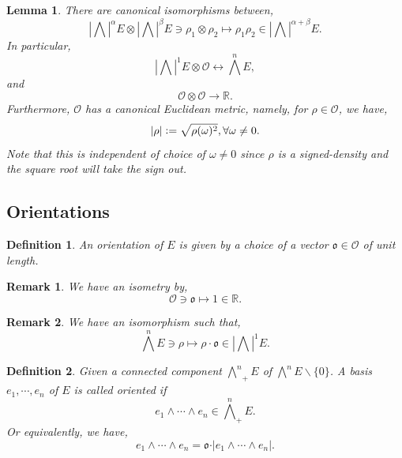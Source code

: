 \documentclass[10pt]{article}
\newtheorem{definition}{Definition}[section]
\newtheorem{lemma}{Lemma}[section]
\newtheorem{remark}{Remark}[section]
\newcommand{\defeq}{\vcentcolon=}
\newcommand{\R}[0]{\mathbb{R}}
\begin{document}
\begin{lemma}
  \label{lemma_11_3}
  There are canonical isomorphisms between,
  \begin{equation*}
  \left\vert\bigwedge\right\vert^\alpha E\otimes\left\vert\bigwedge\right\vert^\beta E\ni \rho_1\otimes\rho_2\mapsto\rho_1\rho_2 \in\left\vert\bigwedge\right\vert^{\alpha+\beta}E.
  \end{equation*}
  In particular,
  \begin{equation*}
    \left\vert\bigwedge\right\vert^1 E\otimes\mathcal{O}\longleftrightarrow \bigwedge^nE,
  \end{equation*}
  and 
  \begin{equation*}
    \mathcal{O}\otimes\mathcal{O}\to\R.
  \end{equation*}
  Furthermore, $\mathcal{O}$ has a canonical Euclidean metric, namely, for $\rho\in\mathcal{O}$, we have,
  \begin{equation*}
    \vert\rho\vert\defeq \sqrt{\rho(\omega)^2},\forall \omega\not=0.
  \end{equation*}
  Note that this is independent of choice of $\omega\not=0$ since $\rho$ is a signed-density and the square root will take the sign out.
\end{lemma}

\subsection{Orientations}

\begin{definition}
  An orientation of $E$ is given by a choice of a vector $\mathfrak{o}\in\mathcal{O}$ of unit length.
\end{definition}

\begin{remark}
  We have an isometry by,
  \begin{equation*}
    \mathcal{O}\ni\mathfrak{o}\mapsto 1\in\R.
  \end{equation*}
\end{remark}

\begin{remark}
  We have an isomorphism such that,
  \begin{equation*}
    \bigwedge^n E\ni\rho\mapsto \rho\cdot\mathfrak{o}\in\left\vert\bigwedge\right\vert^1E.
  \end{equation*}
\end{remark}

\begin{definition}
  Given a connected component ${\bigwedge^n}_+ E$ of $\bigwedge^n E\backslash\{0\}$. 
  A basis $e_1,\cdots,e_n$ of $E$ is called oriented if 
  \begin{equation*}
    e_1\wedge\cdots\wedge e_n\in{\bigwedge^n}_+E.
  \end{equation*}
  Or equivalently, we have,
  \begin{equation*}
    e_1\wedge\cdots\wedge e_n = \mathfrak{o}\cdot\vert e_1\wedge\cdots\wedge e_n\vert.
  \end{equation*}
\end{definition}
\end{document}
